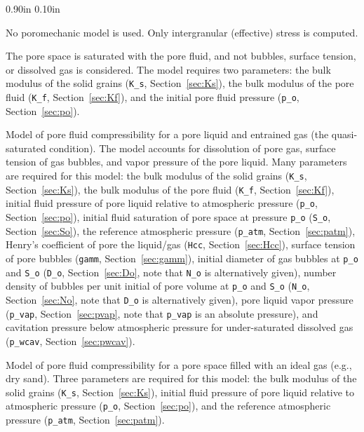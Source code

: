 \documentclass[letterpaper,11pt]{article}
\newlength{\Labelwidth}
\newcommand{\Entrylabel}[1]{\makebox[\Labelwidth][r]{\texttt{#1}}}
\newenvironment{Options}
{\begin{list}{}{%
\renewcommand{\makelabel}{\Entrylabel}%
\setlength{\leftmargin} {0.90in}%
\setlength{\rightmargin}{0.00in}%
\setlength{\labelsep}   {0.10in}%
\setlength{\labelwidth} {\Labelwidth}%
}}
{\end{list}}
\begin{document}
\begin{Options}
  \item[iporo=0]
  No poromechanic model is used.
  Only intergranular (effective) stress is computed.
  \item[iporo=1]
  The pore space is saturated with the pore fluid,
  and not bubbles, surface tension, or dissolved gas
  is considered.
  The model requires two parameters:
  the bulk modulus of the solid grains
  (\texttt{K\_s}, Section~\ref{sec:Ks}),
  the bulk modulus of the pore fluid
  (\texttt{K\_f}, Section~\ref{sec:Kf}),
  and the initial pore fluid pressure
  (\texttt{p\_o}, Section~\ref{sec:po}).
  \item[iporo=3]
  Model of pore fluid compressibility for
  a pore liquid and entrained gas (the quasi-saturated condition).
  The model accounts for dissolution
  of pore gas, surface tension of gas bubbles,
  and vapor pressure of the pore liquid.
  Many parameters are required for this model:
  the bulk modulus of the solid grains
  (\texttt{K\_s}, Section~\ref{sec:Ks}),
  the bulk modulus of the pore fluid
  (\texttt{K\_f}, Section~\ref{sec:Kf}),
  initial fluid pressure of pore liquid relative to
  atmospheric pressure
  (\texttt{p\_o}, Section~\ref{sec:po}),
  initial fluid saturation of pore space at pressure \texttt{p\_o}
  (\texttt{S\_o}, Section~\ref{sec:So}),
  the reference atmospheric pressure
  (\texttt{p\_atm}, Section~\ref{sec:patm}),
  Henry's coefficient of pore the liquid/gas
  (\texttt{Hcc}, Section~\ref{sec:Hcc}),
  surface tension of pore bubbles
  (\texttt{gamm}, Section~\ref{sec:gamm}),
  initial diameter of gas bubbles
  at \texttt{p\_o} and \texttt{S\_o}
  (\texttt{D\_o}, Section~\ref{sec:Do}, note that
  \texttt{N\_o} is alternatively given),
  number density of bubbles per unit initial of pore volume
  at \texttt{p\_o} and \texttt{S\_o}
  (\texttt{N\_o}, Section~\ref{sec:No}, note that
  \texttt{D\_o} is alternatively given),
  pore liquid vapor pressure 
  (\texttt{p\_vap}, Section~\ref{sec:pvap},
  note that \texttt{p\_vap} is an absolute pressure),
  and cavitation pressure below atmospheric 
  pressure for under-saturated dissolved gas
  (\texttt{p\_wcav}, Section~\ref{sec:pwcav}).
  \item[iporo=4]
  Model of pore fluid compressibility for
  a pore space filled with an ideal gas (e.g., dry sand).
  Three parameters are required for this model:
  the bulk modulus of the solid grains
  (\texttt{K\_s}, Section~\ref{sec:Ks}),
  initial fluid pressure of pore liquid relative to
  atmospheric pressure
  (\texttt{p\_o}, Section~\ref{sec:po}), and
  the reference atmospheric pressure
  (\texttt{p\_atm}, Section~\ref{sec:patm}).
\end{Options}
%
\end{document}
